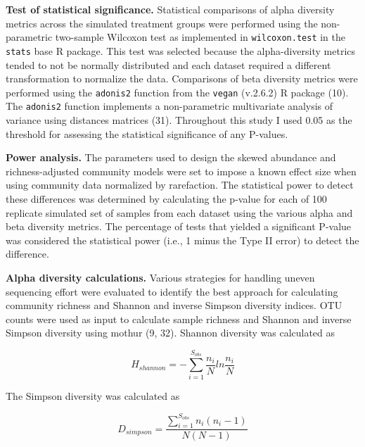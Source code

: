 \documentclass[
]{article}
\begin{document}
\textbf{Test of statistical significance.} Statistical comparisons of
alpha diversity metrics across the simulated treatment groups were
performed using the non-parametric two-sample Wilcoxon test as
implemented in \texttt{wilcoxon.test} in the \texttt{stats} base R
package. This test was selected because the alpha-diversity metrics
tended to not be normally distributed and each dataset required a
different transformation to normalize the data. Comparisons of beta
diversity metrics were performed using the \texttt{adonis2} function
from the \texttt{vegan} (v.2.6.2) R package (10). The \texttt{adonis2}
function implements a non-parametric multivariate analysis of variance
using distances matrices (31). Throughout this study I used 0.05 as the
threshold for assessing the statistical significance of any P-values.

\textbf{Power analysis.} The parameters used to design the skewed
abundance and richness-adjusted community models were set to impose a
known effect size when using community data normalized by rarefaction.
The statistical power to detect these differences was determined by
calculating the p-value for each of 100 replicate simulated set of
samples from each dataset using the various alpha and beta diversity
metrics. The percentage of tests that yielded a significant P-value was
considered the statistical power (i.e., 1 minus the Type II error) to
detect the difference.

\textbf{Alpha diversity calculations.} Various strategies for handling
uneven sequencing effort were evaluated to identify the best approach
for calculating community richness and Shannon and inverse Simpson
diversity indices. OTU counts were used as input to calculate sample
richness and Shannon and inverse Simpson diversity using mothur (9, 32).
Shannon diversity was calculated as

\[H_{shannon} = - \sum_{i=1}^{S_{obs}} \frac{n_i}{N} ln \frac{n_i}{N}\]

The Simpson diversity was calculated as

\[D_{simpson} = \frac {\sum_{i=1}^{S_{obs}} {n_i \left ( n_i - 1 \right )}}{N \left( N-1 \right )}\]
\end{document}
